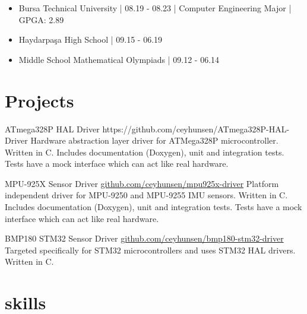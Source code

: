 \documentclass[10pt]{brutalist}
\begin{document}
\begin{itemize}
	\item Bursa Technical University | 08.19 - 08.23 | Computer Engineering Major | GPGA: 2.89
	\item Haydarpaşa High School | 09.15 - 06.19
	\item Middle School Mathematical Olympiads | 09.12 - 06.14
\end{itemize}

\section*{Projects}

\projectbox
{ATmega328P HAL Driver}
{https://github.com/ceyhunsen/ATmega328P-HAL-Driver}
{
	Hardware abstraction layer driver for ATMega328P microcontroller. Written in C. Includes documentation (Doxygen), unit and integration tests. Tests have a mock interface which can act like real hardware.
}

\projectbox
{MPU-925X Sensor Driver}
{\href{https://github.com/ceyhunsen/mpu925x-driver}{github.com/ceyhunsen/mpu925x-driver}}
{
	Platform independent driver for MPU-9250 and MPU-9255 IMU sensors. Written in C. Includes documentation (Doxygen), unit and integration tests. Tests have a mock interface which can act like real hardware.
}

\projectbox
{BMP180 STM32 Sensor Driver}
{\href{https://github.com/ceyhunsen/bmp180-stm32-driver}{github.com/ceyhunsen/bmp180-stm32-driver}}
{
	Targeted specifically for STM32 microcontrollers and uses STM32 HAL drivers. Written in C.
}

\section*{skills}
\end{document}
